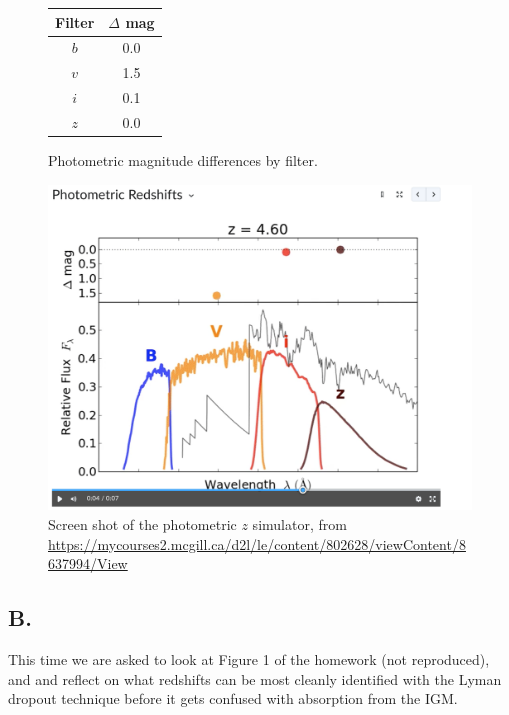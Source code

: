 \begin{figure}[H]
    \centering
    \begin{minipage}{0.45\linewidth}
        \centering
        \label{tab:filter_deltamag}
        \begin{tabular}{c c}
            \hline
            Filter & $\Delta$ mag \\
            \hline
            $b$ & 0.0 \\
            $v$ & 1.5 \\
            $i$ & 0.1 \\
            $z$ & 0.0 \\
            \hline
        \end{tabular}
        \caption{Photometric magnitude differences by filter.}
    \end{minipage}%
    \hfill
    \begin{minipage}{0.45\linewidth}
        \centering
        \includegraphics[width=\linewidth]{images/maxfine_phy644_problemset_1_q1_redshift.png}
        \caption{Screen shot of the photometric $z$ simulator, from \url{https://mycourses2.mcgill.ca/d2l/le/content/802628/viewContent/8637994/View}}
        \label{fig:photometric_z}
    \end{minipage}
\end{figure}




\subsection*{B.}
This time we are asked to look at Figure 1 of the homework (not reproduced), and and reflect on what redshifts can be most cleanly identified with the Lyman dropout technique before it gets confused with absorption from the IGM.  

